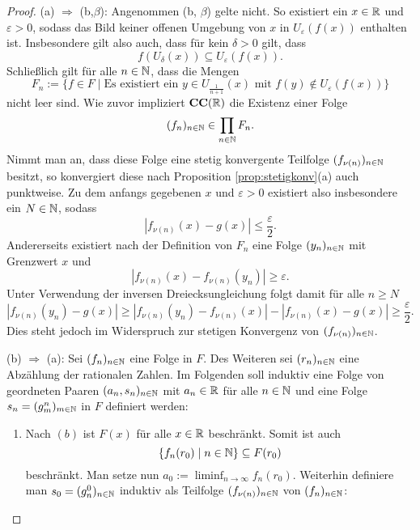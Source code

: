 \begin{proof}
  (a) $\Rightarrow$ (b,$\beta$):
  Angenommen (b, $\beta$) gelte nicht.
  So existiert ein $x \in \mathbb{R}$ und $\varepsilon > 0$, sodass das Bild keiner offenen Umgebung von $x$ in $U_\varepsilon(f(x))$ enthalten ist.
  Insbesondere gilt also auch, dass für kein $\delta > 0$ gilt, dass
  \begin{displaymath}
    f(U_\delta(x)) \subseteq U_\varepsilon(f(x)).
  \end{displaymath}
  Schließlich gilt für alle $n \in \mathbb{N}$, dass die Mengen
  \begin{displaymath}
    F_n := \{ f \in F \mid \text{Es existiert ein } y \in U_{\frac{1}{n+1}}(x) \text{ mit } f(y) \not\in U_\varepsilon(f(x)) \}
  \end{displaymath}
  nicht leer sind.
  Wie zuvor impliziert $\mathbf{CC}(\mathbb{R})$ die Existenz einer Folge 
  \begin{displaymath}
    (f_n)_{n \in \mathbb{N}} \in \prod_{n \in \mathbb{N}} F_n.
  \end{displaymath}
  Nimmt man an, dass diese Folge eine stetig konvergente Teilfolge $(f_{\nu(n)})_{n \in \mathbb{N}}$ besitzt, so konvergiert diese nach Proposition \ref{prop:stetigkonv}(a) auch punktweise.
  Zu dem anfangs gegebenen $x$ und $\varepsilon > 0$ existiert also insbesondere ein $N \in \mathbb{N}$, sodass
  \begin{displaymath}
    | f_{\nu(n)}(x) - g(x) | \leq \frac{\varepsilon}{2}.
  \end{displaymath}
  Andererseits existiert nach der Definition von $F_n$ eine Folge $(y_n)_{n \in \mathbb{N}}$ mit Grenzwert $x$ und
  \begin{displaymath}
    | f_{\nu(n)}(x) -  f_{\nu(n)}(y_n) | \geq \varepsilon.
  \end{displaymath}
  Unter Verwendung der inversen Dreiecksungleichung folgt damit für alle $n \geq N$
  \begin{displaymath}
    | f_{\nu(n)}(y_n) - g(x) | 
    \geq 
    | f_{\nu(n)}(y_n) - f_{\nu(n)}(x) | - | f_{\nu(n)}(x) - g(x)  | 
    \geq \frac{\varepsilon}{2}.
  \end{displaymath}
  Dies steht jedoch im Widerspruch zur stetigen Konvergenz von $(f_{\nu(n)})_{n \in \mathbb{N}}$.

  (b) $\Rightarrow$ (a):
  Sei $(f_n)_{n \in \mathbb{N}}$ eine Folge in $F$.
  Des Weiteren sei $(r_n)_{n \in \mathbb{N}}$ eine Abzählung der rationalen Zahlen.
  Im Folgenden soll induktiv eine Folge von geordneten Paaren $(a_n, s_n)_{n \in \mathbb{N}}$ mit $a_n \in \mathbb{R}$ für alle $n \in \mathbb{N}$ und eine Folge $s_n = (g_m^n)_{m \in \mathbb{N}}$ in $F$ definiert werden:
  \begin{enumerate}
    \item 
      Nach $(b)$ ist $F(x)$ für alle $x \in \mathbb{R}$ beschränkt. 
      Somit ist auch 
      \begin{displaymath}
        \{f_n(r_0) \mid n \in \mathbb{N}\} \subseteq F(r_0)
      \end{displaymath}
      beschränkt.
      Man setze nun $a_0 := \liminf_{n \to \infty} f_n(r_0)$.
      Weiterhin definiere man $s_0 = (g_n^0)_{n \in \mathbb{N}}$ induktiv als Teilfolge $(f_{\nu(n)})_{n \in \mathbb{N}}$ von $(f_n)_{n \in \mathbb{N}}$:
      \begin{itemize}


\end{itemize}
\end{enumerate}
\end{proof}

